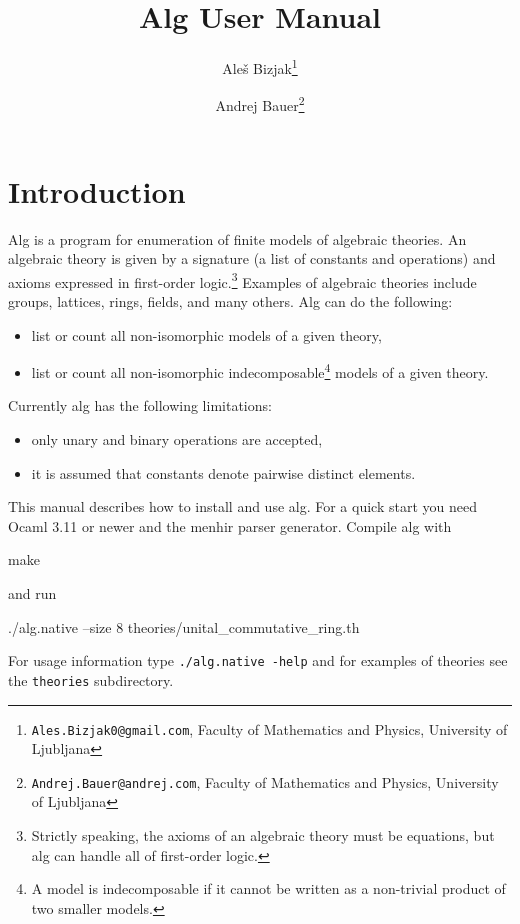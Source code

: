 \documentclass{article}
\begin{document}
\title{Alg User Manual}
\author{Ale\v{s} Bizjak\thanks{\texttt{Ales.Bizjak0@gmail.com},
  Faculty of Mathematics and Physics, University of Ljubljana}
  \and Andrej Bauer\thanks{\texttt{Andrej.Bauer@andrej.com},
    Faculty of Mathematics and Physics, University of Ljubljana}}

\maketitle

\tableofcontents

\section{Introduction}
\label{sec:introduction}

Alg is a program for enumeration of finite models of algebraic
theories. An algebraic theory is given by a signature (a list of
constants and operations) and axioms expressed in first-order
logic.\footnote{Strictly speaking, the axioms of an algebraic theory
  must be equations, but alg can handle all of first-order logic.}
Examples of algebraic theories include groups, lattices, rings,
fields, and many others. Alg can do the following:
%
\begin{itemize}
\item list or count all non-isomorphic models of a given theory,
\item list or count all non-isomorphic indecomposable\footnote{A model
  is indecomposable if it cannot be written as a non-trivial product
  of two smaller models.} models of a given theory.
\end{itemize}
%
Currently alg has the following limitations:
%
\begin{itemize}
\item only unary and binary operations are accepted,
\item it is assumed that constants denote pairwise distinct elements.
\end{itemize}
%
This manual describes how to install and use alg. For a quick start
you need Ocaml 3.11 or newer and the menhir parser generator. Compile
alg with
%
\begin{shell}
make
\end{shell}
%
and run
%
\begin{shell}
./alg.native --size 8 theories/unital_commutative_ring.th
\end{shell}
%
For usage information type \texttt{./alg.native -help} and for
examples of theories see the \texttt{theories} subdirectory.
\end{document}
